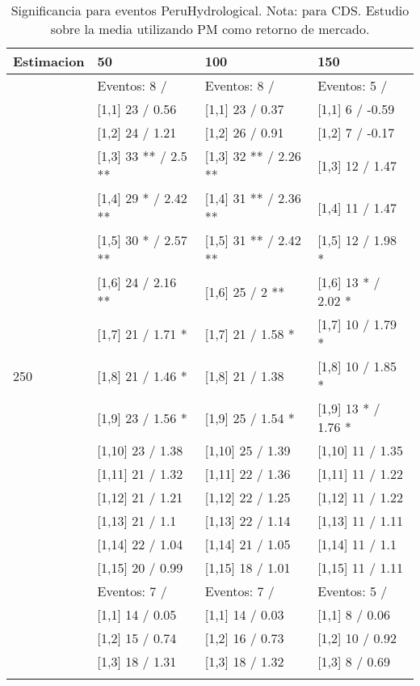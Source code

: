 \begin{table}

\caption{Significancia para eventos PeruHydrological. Nota: para CDS. Estudio sobre la media utilizando PM como retorno de mercado.}
\centering
\begin{tabular}[t]{llll}
\toprule
Estimacion & 50 & 100 & 150\\
\midrule
 & Eventos:  8 / & Eventos:  8 / & Eventos:  5 /\\
 & {}[1,1] 23  / 0.56 & {}[1,1] 23  / 0.37 & {}[1,1] 6  / -0.59\\
 & {}[1,2] 24  / 1.21 & {}[1,2] 26  / 0.91 & {}[1,2] 7  / -0.17\\
 & {}[1,3] 33 ** / 2.5 ** & {}[1,3] 32 ** / 2.26 ** & {}[1,3] 12  / 1.47\\
 & {}[1,4] 29 * / 2.42 ** & {}[1,4] 31 ** / 2.36 ** & {}[1,4] 11  / 1.47\\
\addlinespace
 & {}[1,5] 30 * / 2.57 ** & {}[1,5] 31 ** / 2.42 ** & {}[1,5] 12  / 1.98 *\\
 & {}[1,6] 24  / 2.16 ** & {}[1,6] 25  / 2 ** & {}[1,6] 13 * / 2.02 *\\
 & {}[1,7] 21  / 1.71 * & {}[1,7] 21  / 1.58 * & {}[1,7] 10  / 1.79 *\\
250 & {}[1,8] 21  / 1.46 * & {}[1,8] 21  / 1.38 & {}[1,8] 10  / 1.85 *\\
 & {}[1,9] 23  / 1.56 * & {}[1,9] 25  / 1.54 * & {}[1,9] 13 * / 1.76 *\\
\addlinespace
 & {}[1,10] 23  / 1.38 & {}[1,10] 25  / 1.39 & {}[1,10] 11  / 1.35\\
 & {}[1,11] 21  / 1.32 & {}[1,11] 22  / 1.36 & {}[1,11] 11  / 1.22\\
 & {}[1,12] 21  / 1.21 & {}[1,12] 22  / 1.25 & {}[1,12] 11  / 1.22\\
 & {}[1,13] 21  / 1.1 & {}[1,13] 22  / 1.14 & {}[1,13] 11  / 1.11\\
 & {}[1,14] 22  / 1.04 & {}[1,14] 21  / 1.05 & {}[1,14] 11  / 1.1\\
\addlinespace
 & {}[1,15] 20  / 0.99 & {}[1,15] 18  / 1.01 & {}[1,15] 11  / 1.11\\
 & Eventos:  7 / & Eventos:  7 / & Eventos:  5 /\\
 & {}[1,1] 14  / 0.05 & {}[1,1] 14  / 0.03 & {}[1,1] 8  / 0.06\\
 & {}[1,2] 15  / 0.74 & {}[1,2] 16  / 0.73 & {}[1,2] 10  / 0.92\\
 & {}[1,3] 18  / 1.31 & {}[1,3] 18  / 1.32 & {}[1,3] 8  / 0.69\\
\addlinespace

\end{tabular}
\end{table}
